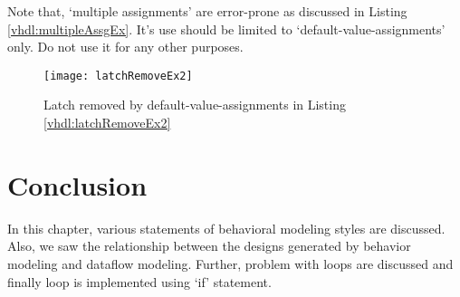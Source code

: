 \begin{noNumBox}
	Note that, `multiple assignments' are error-prone as discussed in Listing \ref{vhdl:multipleAssgEx}. It's use should be limited to `default-value-assignments' only. Do not use it for any other purposes.   
\end{noNumBox}

\begin{figure}
	\centering
	\texttt{[image: latchRemoveEx2]}
	\caption{Latch removed by default-value-assignments in Listing \ref{vhdl:latchRemoveEx2}}
	\label{fig:latchRemoveEx2}
\end{figure}

 
\section{Conclusion}
In this chapter, various statements of behavioral modeling styles are discussed. Also, we saw the relationship between the designs generated by behavior modeling and dataflow modeling. Further, problem with loops are discussed and finally loop is implemented using `if' statement. 